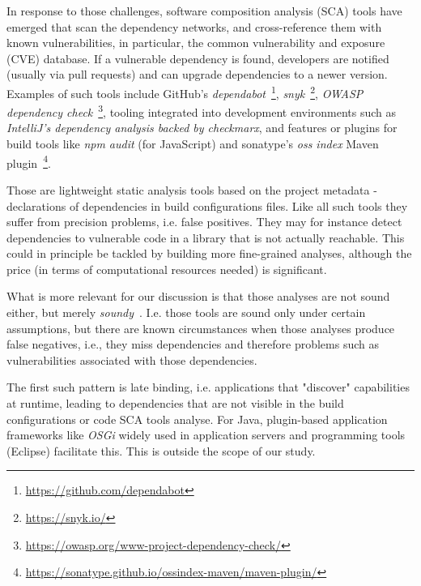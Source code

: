 \documentclass{article}
\begin{document}
In response to those challenges, software composition analysis (SCA)  tools have emerged that scan the dependency networks, and cross-reference them with known vulnerabilities, in particular, the common vulnerability and exposure (CVE) database. If a vulnerable dependency is found, developers are notified (usually via pull requests) and can upgrade dependencies to a newer version.  Examples of such tools include GitHub's \textit{dependabot}~\footnote{\url{https://github.com/dependabot}}, \textit{snyk}~\footnote{\url{https://snyk.io/}},
\textit{OWASP dependency check}~\footnote{\url{https://owasp.org/www-project-dependency-check/}},  tooling integrated into development environments such as \textit{IntelliJ's dependency analysis backed by \textit{checkmarx}},  and features or plugins for build tools like \textit{npm audit} (for JavaScript) and sonatype's \textit{oss index} Maven plugin~\footnote{\url{https://sonatype.github.io/ossindex-maven/maven-plugin/}}.
 
 Those are lightweight static analysis tools based on the project metadata - declarations of dependencies in build configurations files. Like all such tools they suffer from precision problems, i.e. false positives. They may for instance detect dependencies to vulnerable code in a  library that is not actually reachable. This could in principle be tackled by building more fine-grained analyses, although the price (in terms of computational resources needed) is significant. 
 
 
What is more  relevant for our discussion  is that those analyses are not sound either, but merely \textit{soundy}~\cite{livshits2015defense}. I.e. those tools are sound only under certain assumptions, but there are known circumstances when those analyses produce false negatives, i.e., they miss dependencies and therefore problems such as vulnerabilities associated with those dependencies.
 
 The first such pattern is late binding, i.e. applications that "discover" capabilities at runtime, leading to dependencies that are not visible in the build configurations or code SCA tools analyse.  For Java, plugin-based application frameworks like \textit{OSGi} widely used in application servers and programming tools (Eclipse) facilitate this.  This is outside the scope of our study. 
 
\end{document}

